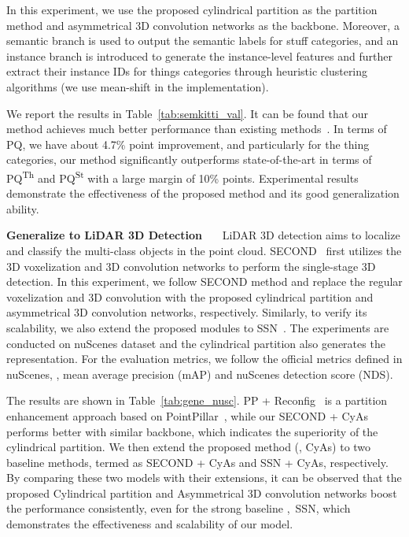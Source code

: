 \documentclass[final]{cvpr}
\begin{document}
In this experiment, we use the proposed cylindrical partition as the partition method and asymmetrical 3D convolution networks as the backbone. Moreover, a semantic branch is used to output the semantic labels for stuff categories, and an instance branch is introduced to generate the instance-level features and further extract their instance IDs for things categories through heuristic clustering algorithms (we use mean-shift in the implementation).

We report the results in Table~\ref{tab:semkitti_val}. It can be found that our method achieves much better performance than existing methods~\cite{milioto2020iros,jiang2020pointgroup}. In terms of PQ, we have about 4.7\% point improvement, and particularly for the thing categories, our method significantly outperforms state-of-the-art in terms of PQ\textsuperscript{Th} and PQ\textsuperscript{St} with a large margin of 10\% points. Experimental results demonstrate the effectiveness of the proposed method and its good generalization ability.



\vspace{1ex}
\noindent\textbf{Generalize to LiDAR 3D Detection}~~~ LiDAR 3D detection aims to localize and classify the multi-class objects in the point cloud. SECOND~\cite{yan2018second} first utilizes the 3D voxelization and 3D convolution networks to perform the single-stage 3D detection. In this experiment, we follow SECOND method and replace the regular voxelization and 3D convolution with the proposed cylindrical partition and asymmetrical 3D convolution networks, respectively. Similarly, to verify its scalability, we also extend the proposed modules to SSN~\cite{zhu2020ssn}. 
The experiments are conducted on nuScenes dataset and the cylindrical partition also generates the  representation. For the evaluation metrics, we follow the official metrics defined in nuScenes, \ie, mean average precision (mAP) and nuScenes detection score (NDS). 

The results are shown in Table~\ref{tab:gene_nusc}. PP + Reconfig~\cite{wang2020reconfigurable} is a partition enhancement approach based on PointPillar~\cite{lang2019pointpillars}, while our SECOND + CyAs performs better with similar backbone, which indicates the superiority of the cylindrical partition.
 We then extend the proposed method (\ie, CyAs) to two baseline methods, termed as SECOND + CyAs and SSN + CyAs, respectively.
 By comparing these two models with their extensions, it can be observed that the proposed Cylindrical partition and Asymmetrical 3D convolution networks boost the performance consistently, even for the strong baseline \ie,~SSN, which demonstrates the effectiveness and scalability of our model.
\end{document}
